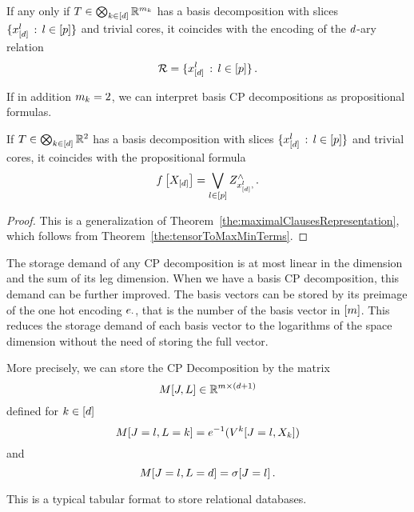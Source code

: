 \begin{theorem}
	If any only if $T\in\bigotimes_{k\in[d]} \mathbb{R}^{m_{k}}$ has a basis decomposition with slices $\{x_{[d]}^{l} \, : \, l\in[p] \}$ and trivial cores, it coincides with the encoding of the $d$-ary relation 
		\[ \mathcal{R} = \{x_{[d]}^{l} \, : \, l\in[p] \} \, . \]
\end{theorem}


If in addition $m_{k}=2$, we can interpret basis CP decompositions as propositional formulas.

\begin{theorem}
	If $T\in\bigotimes_{k\in[d]}\mathbb{R}^2$ has a basis decomposition with slices $\{x_{[d]}^{l} \, : \, l\in[p] \}$ and trivial cores, it coincides with the propositional formula
		\[ f\left[X_{[d]}\right] = 
		\bigvee_{l\in[p]} Z^{\land}_{x_{[d]}^{l},\,} . \]
\end{theorem}
\begin{proof}
	This is a generalization of Theorem~\ref{the:maximalClausesRepresentation}, which follows from Theorem~\ref{the:tensorToMaxMinTerms}.
\end{proof}


The storage demand of any CP decomposition is at most linear in the dimension and the sum of its leg dimension.
When we have a basis CP decomposition, this demand can be further improved.
The basis vectors can be stored by its preimage of the one hot encoding $e_{\cdot}$, that is the number of the basis vector in $[m]$.
This reduces the storage demand of each basis vector to the logarithms of the space dimension without the need of storing the full vector.

More precisely, we can store the CP Decomposition by the matrix
	\[ M[J,L] \in \mathbb{R}^{m \times (d+1)} \]
defined for $k\in[d]$
	\[ M[J=l,L=k] 
	= e^{-1}(V^{k}[J=l,X_{k}])\]
and
	\[ M[J=l,L=d]  
	= \sigma[J=l] \, . \]
	
This is a typical tabular format to store relational databases.

